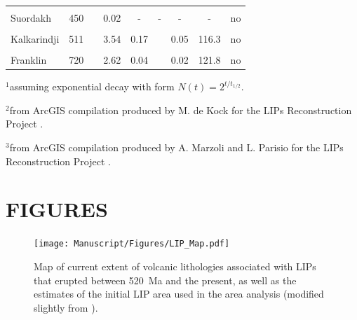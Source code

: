 \documentclass[11pt,letterpaper]{article}
\begin{document}
\begin{table}[h!]
{\begin{tabular}{lc>{\raggedright}p{4cm}cc>{\raggedright}p{4cm}ccl}
 & & & & & & & & \\
Suordakh & 450 & \cite{Khudoley2013a} & 0.02 & - & - & - & - & no \\
 & & & & & & & & \\
Kalkarindji & 511 & \cite{Jourdan2014a} & 3.54 & 0.17 & \cite{Thorne2014a} & 0.05 & 116.3 & no \\
 & & & & & & & & \\
Franklin & 720 & \cite{Denyszyn2009a} & 2.62 & 0.04 & \cite{Buchan2004a} & 0.02 & 121.8 & no \\
\bottomrule
\end{tabular}
}
\begin{tablenotes}
$^{1}$assuming exponential decay with form $N(t) = 2^{t/t_{1/2}}$.

$^{2}$from ArcGIS compilation produced by M. de Kock for the LIPs Reconstruction Project \citep{Ernst2013a}.

$^{3}$from ArcGIS compilation produced by A. Marzoli and L. Parisio for the LIPs Reconstruction Project \citep{Ernst2013a}.
\end{tablenotes}
\label{tab:LIPs}
\end{table}

\clearpage
\newpage

\section*{FIGURES}

\begin{figure}[h!]
\begin{center}
	\texttt{[image: Manuscript/Figures/LIP\_Map.pdf]}
	\caption{Map of current extent of volcanic lithologies associated with LIPs that erupted between 520~Ma and the present, as well as the estimates of the initial LIP area used in the area analysis (modified slightly from \citealp{Ernst2017a}).}
	\label{fig:LIP_map}
\end{center}
\end{figure}
\end{document}
